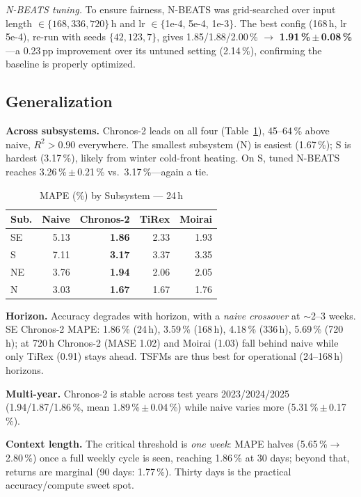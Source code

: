 \documentclass[conference]{IEEEtran}
\begin{document}
\emph{N-BEATS tuning.} To ensure fairness, N-BEATS was grid-searched over input length
$\in\{168,336,720\}$\,h and lr $\in\{$1e-4, 5e-4, 1e-3$\}$. The best config (168\,h,
lr 5e-4), re-run with seeds $\{42,123,7\}$, gives 1.85/1.88/2.00\,\%
$\rightarrow$ \textbf{1.91\,\%\,$\pm$\,0.08\,\%}---a 0.23\,pp improvement over its
untuned setting (2.14\,\%), confirming the baseline is properly optimized.

\subsection{Generalization}
\textbf{Across subsystems.} Chronos-2 leads on all four (Table~\ref{tab:subs}),
45--64\,\% above naive, $R^2>0.90$ everywhere. The smallest subsystem (N) is easiest
(1.67\,\%); S is hardest (3.17\,\%), likely from winter cold-front heating. On S, tuned
N-BEATS reaches 3.26\,\%\,$\pm$\,0.21\,\% vs.\ 3.17\,\%---again a tie.

\begin{table}[t]
\centering
\caption{MAPE (\%) by Subsystem --- 24\,h}
\label{tab:subs}
\begin{tabular}{lrrrr}
\toprule
Sub. & Naive & Chronos-2 & TiRex & Moirai \\
\midrule
SE & 5.13 & \textbf{1.86} & 2.33 & 1.93 \\
S  & 7.11 & \textbf{3.17} & 3.37 & 3.35 \\
NE & 3.76 & \textbf{1.94} & 2.06 & 2.05 \\
N  & 3.03 & \textbf{1.67} & 1.67 & 1.76 \\
\bottomrule
\end{tabular}
\end{table}

\textbf{Horizon.} Accuracy degrades with horizon, with a \emph{naive crossover} at
$\sim$2--3 weeks. SE Chronos-2 MAPE: 1.86\,\% (24\,h), 3.59\,\% (168\,h), 4.18\,\%
(336\,h), 5.69\,\% (720\,h); at 720\,h Chronos-2 (MASE 1.02) and Moirai (1.03) fall
behind naive while only TiRex (0.91) stays ahead. TSFMs are thus best for operational
(24--168\,h) horizons.

\textbf{Multi-year.} Chronos-2 is stable across test years 2023/2024/2025
(1.94/1.87/1.86\,\%, mean 1.89\,\%\,$\pm$\,0.04\,\%) while naive varies more
(5.31\,\%\,$\pm$\,0.17\,\%).

\textbf{Context length.} The critical threshold is \emph{one week}: MAPE halves
(5.65\,\%$\rightarrow$2.80\,\%) once a full weekly cycle is seen, reaching 1.86\,\% at
30 days; beyond that, returns are marginal (90 days: 1.77\,\%). Thirty days is the
practical accuracy/compute sweet spot.
\end{document}
